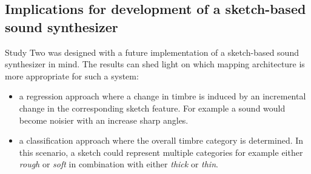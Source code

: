 \documentclass[]{interact}
\theoremstyle{plain}%
\theoremstyle{definition}
\theoremstyle{remark}
\begin{document}
\subsection{Implications for development of a sketch-based sound synthesizer}\label{subsec:disc_sketch-based_synth}

Study Two was designed with a future implementation of a sketch-based sound synthesizer in mind. The results can shed light on which mapping architecture is more appropriate for such a system:
\begin{itemize}
    \item a regression approach where a change in timbre is induced by an incremental change in the corresponding sketch feature. For example a sound would become noisier with an increase sharp angles. 
    \item a classification approach where the overall timbre category is determined. In this scenario, a sketch could represent multiple categories for example either \textit{rough} or \textit{soft} in combination with either \textit{thick} or \textit{thin}.
\end{itemize}
   
\end{document}
